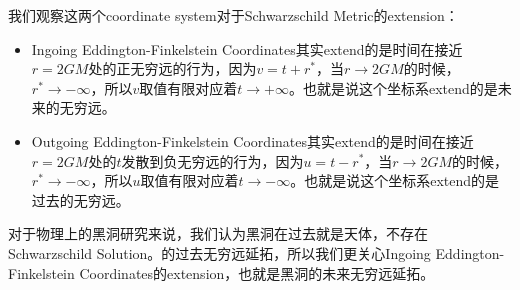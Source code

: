 \bigskip
{}

我们观察这两个coordinate system对于Schwarzschild Metric的extension：
\begin{itemize}
  \item Ingoing Eddington-Finkelstein Coordinates其实extend的是时间在接近$ r =
    2GM $处的正无穷远的行为，因为$ v = t + r^* $，当$ r \to 2GM $的时候，$ r^* \to
    -\infty $，所以$ v $取值有限对应着$ t \to +\infty $。也就是说这个坐标系extend的是未来的无穷远。
  \item Outgoing Eddington-Finkelstein Coordinates其实extend的是时间在接近$ r
    = 2GM $处的$ t $发散到负无穷远的行为，因为$ u = t - r^* $，当$ r \to 2GM $的时候，$
    r^* \to -\infty $，所以$ u $取值有限对应着$ t \to -\infty $。也就是说这个坐标系extend的是过去的无穷远。
\end{itemize}
对于物理上的黑洞研究来说，我们认为黑洞在过去就是天体，不存在Schwarzschild
Solution。的过去无穷远延拓，所以我们更关心Ingoing Eddington-Finkelstein
Coordinates的extension，也就是黑洞的未来无穷远延拓。
